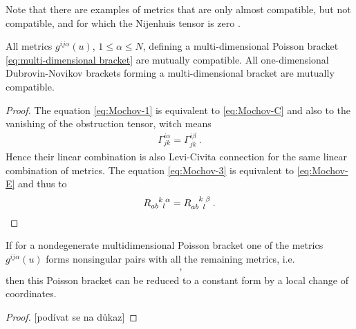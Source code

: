 Note that there are examples of metrics that are only almost compatible, but not compatible, and for which the Nijenhuis tensor is zero \cite{Mochov-compatibility}. 

\begin{theorem}
    All metrics $g^{ij \alpha}(u)$, $1 \leq \alpha \leq N$, defining a multi-dimensional Poisson bracket \eqref{eq:multi-dimensional bracket} are mutually compatible. All one-dimensional Dubrovin-Novikov brackets forming a multi-dimensional bracket are mutually compatible.
\end{theorem}
\begin{proof}
    The equation \eqref{eq:Mochov-1} is equivalent to \eqref{eq:Mochov-C} and also to the vanishing of the obstruction tensor, witch means
    \begin{align}
        \Gamma^{i\alpha}_{jk} = \Gamma^{i \beta}_{jk} \:.
    \end{align}
    Hence their linear combination is also Levi-Civita connection for the same linear combination of metrics.
    The equation \eqref{eq:Mochov-3} is equivalent to \eqref{eq:Mochov-E} and thus to
    \begin{align}
        R\indices{_a_b^k_l^\alpha} =  R\indices{_a_b^k_l^\beta} \:.
    \end{align}
\end{proof}

\begin{theorem}
    If for a nondegenerate multidimensional Poisson bracket one of the metrics $g^{ij \alpha}(u)$ forms nonsingular pairs with all the remaining metrics, i.e.
    \begin{align}
        \:,
    \end{align}
    then this Poisson bracket can be reduced to a constant form by a local change of coordinates.
\end{theorem}

\begin{proof}
    [podívat se na důkaz]
\end{proof}

